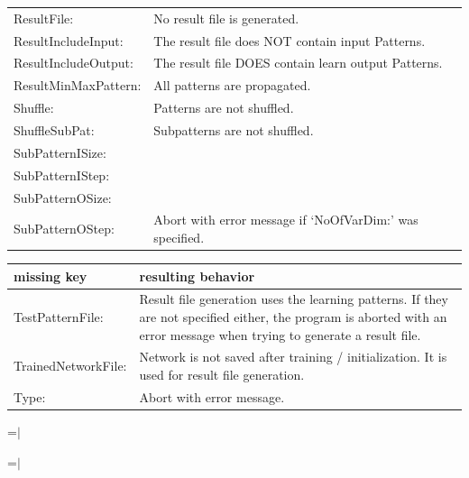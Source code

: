 {\begin{tabular}{|l|p{90mm}|}
ResultFile:             &No result file is generated.\\ 

ResultIncludeInput:     &The result file does NOT contain input Patterns.\\ 

ResultIncludeOutput:    &The result file DOES contain learn output
Patterns.\\ 

ResultMinMaxPattern:    &All patterns are propagated.\\ 

Shuffle:                &Patterns are not shuffled.\\ 

ShuffleSubPat:          &Subpatterns are not shuffled.\\ 

SubPatternISize:        & \\ 
SubPatternIStep:        & \\ 
SubPatternOSize:        & \\ 
SubPatternOStep:        &Abort with error message if `NoOfVarDim:' was
specified.\\  \hline
\end{tabular}
}

{\newpage
\clearpage
\samepage \begin{tabular}{|l|p{105mm}|}
\hline
missing key            &resulting behavior\\  \hline \hline

TestPatternFile:        &Result file generation uses the learning patterns.
                        If they are not specified either, the program
                        is aborted with an error message when trying
                        to generate a result  file.\\ 

TrainedNetworkFile:     &Network is not saved after training /
                        initialization. It is used for
                        result file generation.\\  

Type:                   &Abort with error message.\\ 
\hline
\end{tabular}
}

{\newpage
\clearpage
\samepage \setbox\sizebox=\hbox{$\mid$}\box\sizebox
}

{\newpage
\clearpage
\samepage \setbox\sizebox=\hbox{$\mid$}\box\sizebox
}

